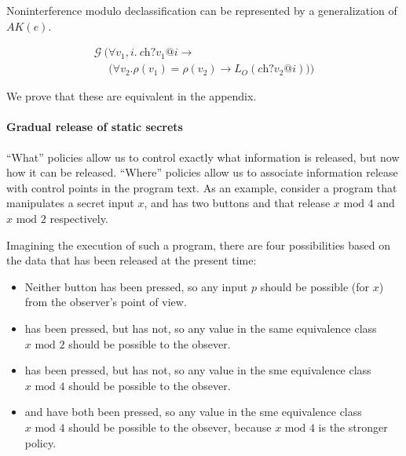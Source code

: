 \documentclass[conference]{IEEEtran}
\newcommand{\code}[1]{\text{\lstinline!#1!}}
\theoremstyle{definition}
\newcommand{\sch}{\textit{ch}}
\newcommand{\prin}{\textit{O}}
\newcommand{\talways}{\mathcal{G}}
\begin{document}
Noninterference modulo declassification can be represented by a
generalization of $AK(e)$.

\begin{Definition}
  \begin{displaymath}
    \begin{array}{l}
      \talways ~ \Big( \forall v_1, i. ~ \sch ? v_1 @ i \rightarrow \\
      ~~~~~~ \big( \forall v_2. \rho(v_1) = \rho(v_2) \rightarrow 
      L_\prin(\sch ? v_2 @ i) \big) \Big)
    \end{array}
  \end{displaymath}
\end{Definition}

We prove that these are equivalent in the appendix.

\paragraph*{Gradual release of static secrets}

``What'' policies allow us to control exactly what information is
released, but now how it can be released.  ``Where'' policies allow us
to associate information release with control points in the program
text.  As an example, consider a program that manipulates a secret
input $x$, and has two buttons \code{id_a} and \code{id_b} that
release $x \textrm{~mod~} 4$ and $x \textrm{~mod~} 2$ respectively.

Imagining the execution of such a program, there are four
possibilities based on the data that has been released at the present
time:

\begin{itemize}
\item Neither button has been pressed, so any input $p$ should be
  possible (for $x$) from the observer's point of view.
\item \code{id_a} has been pressed, but \code{id_b} has not, so any
  value in the same equivalence class $x \textrm{~mod~} 2$ should be
  possible to the obsever.
\item \code{id_b} has been pressed, but \code{id_a} has not, so any
  value in the sme equivalence class $x \textrm{~mod~} 4$ should be
  possible to the obsever.
\item \code{id_a} and \code{id_a} have both been pressed, so any value
  in the sme equivalence class $x \textrm{~mod~} 4$ should be possible
  to the obsever, because $x \textrm{~mod~} 4$ is the stronger policy.
\end{itemize}
\end{document}
